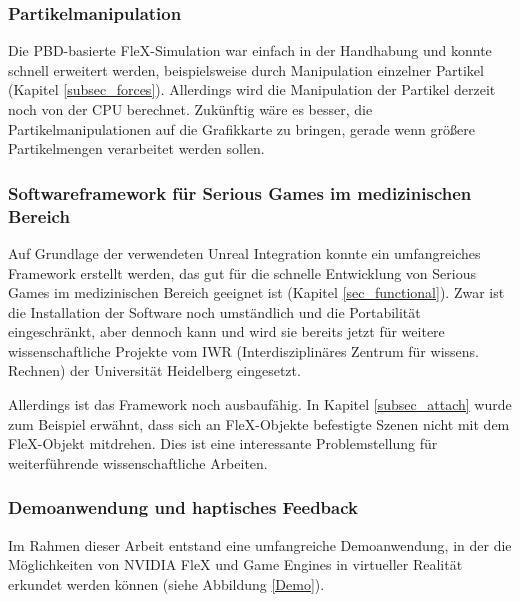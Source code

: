 \subsubsection{Partikelmanipulation}
Die PBD-basierte FleX-Simulation war einfach in der Handhabung und konnte schnell erweitert werden, beispielsweise durch Manipulation einzelner Partikel (Kapitel \ref{subsec_forces}). Allerdings wird die Manipulation der Partikel derzeit noch von der CPU berechnet. Zukünftig wäre es besser, die Partikelmanipulationen auf die Grafikkarte zu bringen, gerade wenn größere Partikelmengen verarbeitet werden sollen. 

\subsubsection{Softwareframework für Serious Games im medizinischen Bereich}
Auf Grundlage der verwendeten Unreal Integration konnte ein umfangreiches Framework erstellt  werden, das gut für die schnelle Entwicklung von Serious Games im medizinischen Bereich geeignet ist (Kapitel \ref{sec_functional}). 
Zwar ist die Installation der Software noch umständlich  und die Portabilität eingeschränkt, aber dennoch kann und wird sie bereits jetzt für weitere wissenschaftliche Projekte vom IWR (Interdisziplinäres Zentrum für wissens. Rechnen) der Universität Heidelberg eingesetzt. 

Allerdings ist das Framework noch ausbaufähig. In Kapitel \ref{subsec_attach} wurde zum Beispiel erwähnt, dass sich an FleX-Objekte befestigte Szenen nicht mit dem FleX-Objekt mitdrehen. Dies ist eine interessante Problemstellung für weiterführende wissenschaftliche Arbeiten.

\subsubsection{Demoanwendung und haptisches Feedback}
Im Rahmen dieser Arbeit entstand eine umfangreiche Demoanwendung, in der die Möglichkeiten von NVIDIA FleX und Game Engines in virtueller Realität erkundet werden können (siehe Abbildung \ref{Demo}). 

